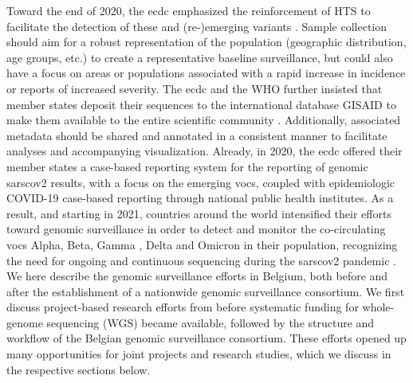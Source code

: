 Toward the end of 2020, the \gls{ecdc} emphasized the reinforcement of HTS to facilitate the detection of these and (re-)emerging variants \citep{ecdcSequencing}.
Sample collection should aim for a robust representation of the population (geographic distribution, age groups, etc.) to create a representative baseline surveillance, but could also have a focus on areas or populations associated with a rapid increase in incidence or reports of increased severity.
The \gls{ecdc} and the WHO further insisted that member states deposit their sequences to the international database GISAID \citep{shu2017gisaid} to make them available to the entire scientific community \citep{ecdcSequencing}.
Additionally, associated metadata should be shared and annotated in a consistent manner to facilitate analyses and accompanying visualization.
Already, in 2020, the \gls{ecdc} offered their member states a case-based reporting system for the reporting of genomic \gls{sarscov2} results, with a focus on the emerging \gls{voc}s, coupled with epidemiologic COVID-19 case-based reporting through national public health institutes.
As a result, and starting in 2021, countries around the world intensified their efforts toward genomic surveillance in order to detect and monitor the co-circulating \gls{voc}s Alpha, Beta, Gamma \citep{greaney2021comprehensive}, Delta and Omicron in their population, recognizing the need for ongoing and continuous sequencing during the \gls{sarscov2} pandemic \citep{martin2021insights}.
We here describe the genomic surveillance efforts in Belgium, both before and after the establishment of a nationwide genomic surveillance consortium.
We first discuss project-based research efforts from before systematic funding for whole-genome sequencing (WGS) became available, followed by the structure and workflow of the Belgian genomic surveillance consortium.
These efforts opened up many opportunities for joint projects and research studies, which we discuss in the respective sections below.



